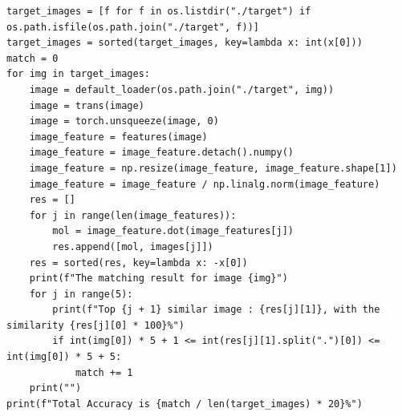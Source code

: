 \documentclass{article}
\begin{document}
\begin{lstlisting}
target_images = [f for f in os.listdir("./target") if os.path.isfile(os.path.join("./target", f))]
target_images = sorted(target_images, key=lambda x: int(x[0]))
match = 0
for img in target_images:
    image = default_loader(os.path.join("./target", img))
    image = trans(image)
    image = torch.unsqueeze(image, 0)
    image_feature = features(image)
    image_feature = image_feature.detach().numpy()
    image_feature = np.resize(image_feature, image_feature.shape[1])
    image_feature = image_feature / np.linalg.norm(image_feature)
    res = []
    for j in range(len(image_features)):
        mol = image_feature.dot(image_features[j])
        res.append([mol, images[j]])
    res = sorted(res, key=lambda x: -x[0])
    print(f"The matching result for image {img}")
    for j in range(5):
        print(f"Top {j + 1} similar image : {res[j][1]}, with the similarity {res[j][0] * 100}%")
        if int(img[0]) * 5 + 1 <= int(res[j][1].split(".")[0]) <= int(img[0]) * 5 + 5:
            match += 1
    print("")
print(f"Total Accuracy is {match / len(target_images) * 20}%")
\end{lstlisting}
\end{document}
